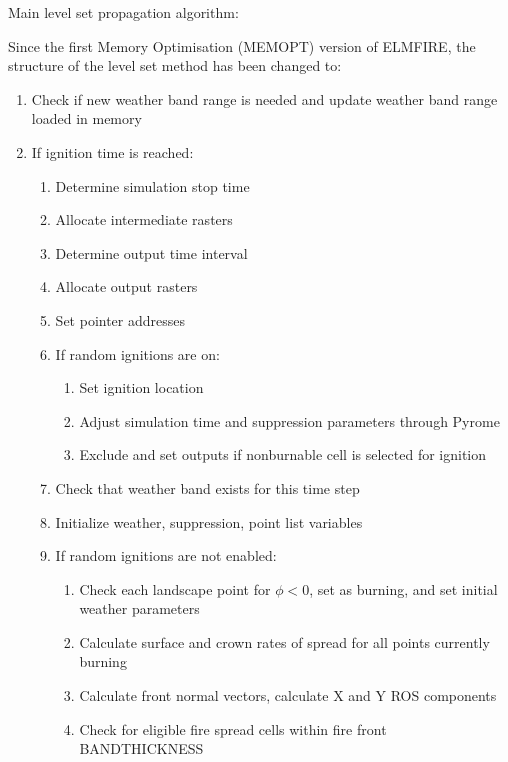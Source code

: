 Main level set propagation algorithm:

Since the first Memory Optimisation (MEMOPT) version of ELMFIRE, the structure of the level set method has been changed to:
\begin{enumerate}
    \item Check if new weather band range is needed and update weather band range loaded in memory
    \item If ignition time is reached:
        \begin{enumerate}
            \item Determine simulation stop time
            \item Allocate intermediate rasters
            \item Determine output time interval
            \item Allocate output rasters
            \item Set pointer addresses
            \item If random ignitions are on:
            \begin{enumerate}
                \item Set ignition location
                \item Adjust simulation time and suppression parameters through Pyrome
                \item Exclude and set outputs if nonburnable cell is selected for ignition
            \end{enumerate}
            \item Check that weather band exists for this time step
            \item Initialize weather, suppression, point list variables
            \item If random ignitions are not enabled:
            \begin{enumerate}
                \item Check each landscape point for $\phi < 0$, set as burning, and set initial weather parameters
                \item Calculate surface and crown rates of spread for all points currently burning
                \item Calculate front normal vectors, calculate X and Y ROS components
                \item Check for eligible fire spread cells within fire front BANDTHICKNESS
            \end{enumerate}
        \end{enumerate}

\end{enumerate}
